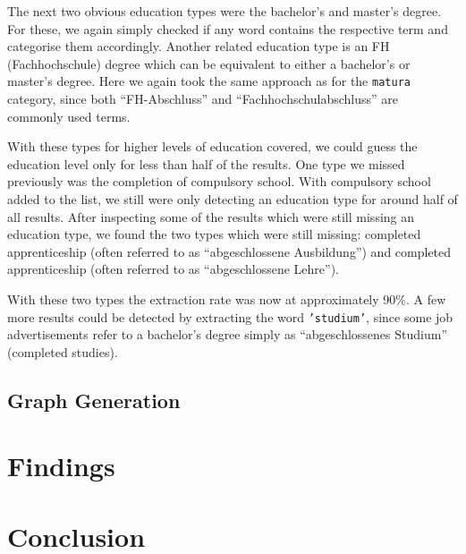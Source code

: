 \documentclass[runningheads]{llncs}
\begin{document}
The next two obvious education types were the bachelor's and master's degree. For these, we again simply checked if any word contains the respective term and categorise them accordingly. Another related education type is an FH (Fachhochschule) degree which can be equivalent to either a bachelor's or master's degree. Here we again took the same approach as for the \texttt{matura} category, since both “FH-Abschluss” and “Fachhochschulabschluss” are commonly used terms.

With these types for higher levels of education covered, we could guess the education level only for less than half of the results. One type we missed previously was the completion of compulsory school. With compulsory school added to the list, we still were only detecting an education type for around half of all results. After inspecting some of the results which were still missing an education type, we found the two types which were still missing: completed apprenticeship (often referred to as “abgeschlossene Ausbildung”) and completed apprenticeship (often referred to as “abgeschlossene Lehre”).

With these two types the extraction rate was now at approximately 90\%. A few more results could be detected by extracting the word \texttt{'studium'}, since some job advertisements refer to a bachelor's degree simply as “abgeschlossenes Studium” (completed studies).

\subsection{Graph Generation}
\label{sub:graph_generation}

\section{Findings}
\label{sec:findings}

\section{Conclusion}
\label{sec:conclusion}

\newpage
\printbibliography
\end{document}
